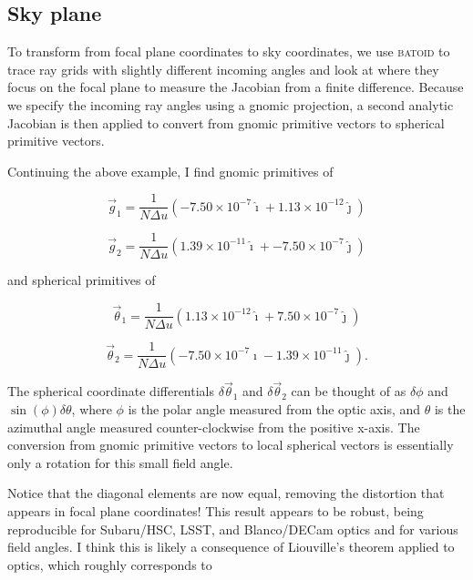 \documentclass{article}
\begin{document}
\subsection{Sky plane}

To transform from focal plane coordinates to sky coordinates, we use \textsc{batoid} to trace ray
grids with slightly different incoming angles and look at where they focus on the focal plane to
measure the Jacobian from a finite difference.  Because we specify the incoming ray angles using a
gnomic projection, a second analytic Jacobian is then applied to convert from gnomic primitive vectors
to spherical primitive vectors.

Continuing the above example, I find gnomic primitives of

\begin{equation}
    \vec{g}_1 = \frac{1}{N \Delta u} (-7.50 \times 10^{-7} \hat{\imath} + 1.13 \times 10^{-12} \hat{\jmath})
\end{equation}

\begin{equation}
    \vec{g}_2 = \frac{1}{N \Delta u} (1.39 \times 10^{-11} \hat{\imath} + -7.50 \times 10^{-7} \hat{\jmath})
\end{equation}

and spherical primitives of

\begin{equation}
    \vec{\theta}_1 = \frac{1}{N \Delta u} (1.13 \times 10^{-12} \hat{\imath} + 7.50 \times 10^{-7} \hat{\jmath})
\end{equation}

\begin{equation}
    \vec{\theta}_2 = \frac{1}{N \Delta u} (-7.50 \times 10^{-7} \hat{\imath} -1.39 \times 10^{-11} \hat{\jmath}).
\end{equation}

The spherical coordinate differentials $\delta \vec{\theta}_1$ and $\delta \vec{\theta}_2$ can be
thought of as $\delta \phi$ and $\sin(\phi) \delta \theta$, where $\phi$ is the polar angle measured
from the optic axis, and $\theta$ is the azimuthal angle measured counter-clockwise from the
positive x-axis.  The conversion from gnomic primitive vectors to local spherical vectors is
essentially only a rotation for this small field angle.

Notice that the diagonal elements are now equal, removing the distortion that appears in focal plane
coordinates!  This result appears to be robust, being reproducible for Subaru/HSC, LSST, and
Blanco/DECam optics and for various field angles.  I think this is likely a consequence of
Liouville's theorem applied to optics, which roughly corresponds to
\end{document}
